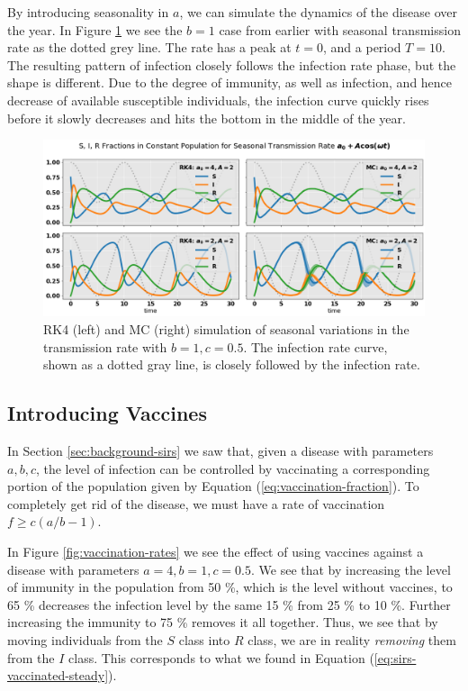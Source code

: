 \documentclass[]{article}
\begin{document}
By introducing seasonality in $a$, we can simulate the dynamics of the disease over the year. In Figure \ref{fig:seasonal-transmission-rate} we see the $b=1$ case from earlier with seasonal transmission rate as the dotted grey line. The rate has a peak at $t=0$, and a period $T=10$. The resulting pattern of infection closely follows the infection rate phase, but the shape is different. Due to the degree of immunity, as well as infection, and hence decrease of available susceptible individuals, the infection curve quickly rises before it slowly decreases and hits the bottom in the middle of the year.

\begin{figure}[!h]
	\centering
	\includegraphics[width=1\linewidth]{./figs/seasonal-transmission-rate.png}
	\caption{RK4 (left) and MC (right) simulation of seasonal variations in the transmission rate with $b=1, c=0.5$. The infection rate curve, shown as a dotted gray line, is closely followed by the infection rate.}
	\label{fig:seasonal-transmission-rate}
\end{figure}


\subsection{Introducing Vaccines} \label{sec:vaccines}

In Section \ref{sec:background-sirs} we saw that, given a disease with parameters $a,b,c$, the level of infection can be controlled by vaccinating a corresponding portion of the population given by Equation (\ref{eq:vaccination-fraction}). To completely get rid of the disease, we must have a rate of vaccination $f \ge c(a/b - 1)$.

In Figure \ref{fig:vaccination-rates} we see the effect of using vaccines against a disease with parameters $a=4, b=1, c=0.5$. We see that by increasing the level of immunity in the population from 50 \%, which is the level without vaccines, to 65 \% decreases the infection level by the same 15 \% from 25 \% to 10 \%.  Further increasing the immunity to 75 \% removes it all together. Thus, we see that by moving individuals from the $S$ class into $R$ class, we are in reality \textit{removing} them from the $I$ class. This corresponds to what we found in Equation (\ref{eq:sirs-vaccinated-steady}).
\end{document}
